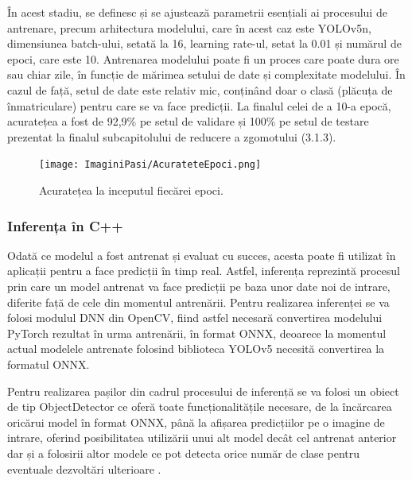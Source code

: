 \documentclass[12pt]{article}
\begin{document}
\^{I}n acest stadiu, se definesc și se ajusteaz\u{a} parametrii esențiali ai procesului de antrenare, precum arhitectura modelului, care \^{i}n acest caz este YOLOv5n, dimensiunea batch-ului, setat\u{a} la 16, learning rate-ul, setat la 0.01 și num\u{a}rul de epoci, care este 10. Antrenarea modelului poate fi un proces care poate dura ore sau chiar zile, \^{i}n funcție de m\u{a}rimea setului de date și complexitate modelului. \^{I}n cazul de faț\u{a}, setul de date este relativ mic, conțin\^{a}nd doar o clas\u{a} (pl\u{a}cuța de \^{i}nmatriculare) pentru care se va face predicții. La finalul celei de a 10-a epoc\u{a}, acuratețea a fost de 92,9\% pe setul de validare și 100\% pe setul de testare prezentat la finalul subcapitolului de reducere a zgomotului (3.1.3).

\begin{figure}[H]
  \centering
  \texttt{[image: ImaginiPasi/AcurateteEpoci.png]}
  \caption{Acuratețea la inceputul fiec\u{a}rei epoci.}
  \label{fig:acuratete_epoci}
\end{figure}

\subsubsection{Inferența \^{i}n C++}

Odat\u{a} ce modelul a fost antrenat și evaluat cu succes, acesta poate fi utilizat \^{i}n aplicații pentru a face predicții \^{i}n timp real. Astfel, inferența reprezint\u{a} procesul prin care un model antrenat va face predicții pe baza unor date noi de intrare, diferite faț\u{a} de cele din momentul antren\u{a}rii. Pentru realizarea inferenței se va folosi modulul DNN din OpenCV, fiind astfel necesar\u{a} convertirea modelului PyTorch rezultat \^{i}n urma antren\u{a}rii, \^{i}n format ONNX, deoarece la momentul actual modelele antrenate folosind biblioteca YOLOv5 necesit\u{a} convertirea la formatul ONNX.

Pentru realizarea pașilor din cadrul procesului de inferenț\u{a} se va folosi un obiect de tip ObjectDetector ce ofer\u{a} toate funcționalit\u{a}țile necesare, de la \^{i}nc\u{a}rcarea oric\u{a}rui model \^{i}n format ONNX, p\^{a}n\u{a} la afișarea predicțiilor pe o imagine de intrare, oferind posibilitatea utiliz\u{a}rii unui alt model dec\^{a}t cel antrenat anterior dar și a folosirii altor modele ce pot detecta orice num\u{a}r de clase pentru eventuale dezvolt\u{a}ri ulterioare \cite{inference}. 
\end{document}
